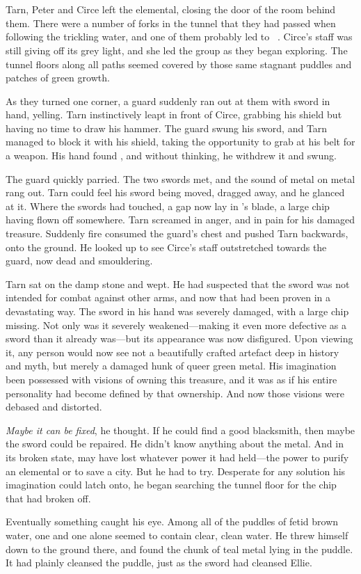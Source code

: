\chapter{\mothzam\ \driktur}

Tarn, Peter and Circe left the elemental, closing the door of the room behind them.  There were a number of forks in the tunnel that they had passed when following the trickling water, and one of them probably led to \mothzam\ \driktur.  Circe's staff was still giving off its grey light, and she led the group as they began exploring.  The tunnel floors along all paths seemed covered by those same stagnant puddles and patches of green growth.

As they turned one corner, a guard suddenly ran out at them with sword in hand, yelling.  Tarn instinctively leapt in front of Circe, grabbing his shield but having no time to draw his hammer.    The guard swung his sword, and Tarn managed to block it with his shield, taking the opportunity to grab at his belt for a weapon.  His hand found \kildir, and without thinking, he withdrew it and swung.

The guard quickly parried.  The two swords met, and the sound of metal on metal rang out.  Tarn could feel his sword being moved, dragged away, and he glanced at it.  Where the swords had touched, a gap now lay in \kildir's blade, a large chip having flown off somewhere.  Tarn screamed in anger, and in pain for his damaged treasure.  Suddenly fire consumed the guard's chest and pushed Tarn backwards, onto the ground.  He looked up to see Circe's staff outstretched towards the guard, now dead and smouldering.

Tarn sat on the damp stone and wept.  He had suspected that the sword was not intended for combat against other arms, and now that had been proven in a devastating way.  The sword in his hand was severely damaged, with a large chip missing.  Not only was it severely weakened---making it even more defective as a sword than it already was---but its appearance was now disfigured.  Upon viewing it, any person would now see not a beautifully crafted artefact deep in history and myth, but merely a damaged hunk of queer green metal.  His imagination been possessed with visions of owning this treasure, and it was as if his entire personality had become defined by that ownership.  And now those visions were debased and distorted.

\emph{Maybe it can be fixed}, he thought.  If he could find a good blacksmith, then maybe the sword could be repaired.  He didn't know anything about the metal.  And in its broken state, \kildir may have lost whatever power it had held---the power to purify an elemental or to save a city.  But he had to try.  Desperate for any solution his imagination could latch onto, he began searching the tunnel floor for the chip that had broken off.

Eventually something caught his eye.  Among all of the puddles of fetid brown water, one and one alone seemed to contain clear, clean water.  He threw himself down to the ground there, and found the chunk of teal metal lying in the puddle.  It had plainly cleansed the puddle, just as the sword had cleansed Ellie.